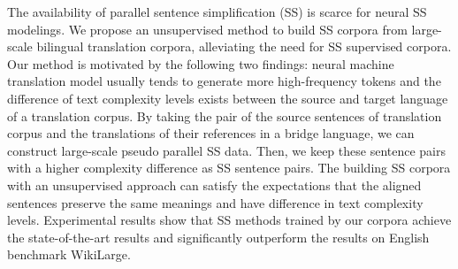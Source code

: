 The availability of parallel sentence simplification (SS) is scarce for neural SS modelings. We propose an unsupervised method to build SS corpora from large-scale bilingual translation corpora, alleviating the need for SS supervised corpora. Our method is motivated by the following two findings: neural machine translation model usually tends to generate more high-frequency tokens and the difference of text complexity levels exists between the source and target language of a translation corpus. By taking the pair of the source sentences of translation corpus and the translations of their references in a bridge language, we can construct large-scale pseudo parallel SS data. Then, we keep these sentence pairs with a higher complexity difference as SS sentence pairs. The building SS corpora with an unsupervised approach can satisfy the expectations that the aligned sentences preserve the same meanings and have difference in text complexity levels. Experimental results show that SS methods trained by our corpora achieve the state-of-the-art results and significantly outperform the results on English benchmark WikiLarge.
